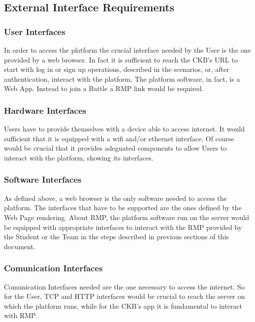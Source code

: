 \subsection{External Interface Requirements}

\subsubsection{User Interfaces}
In order to access the platform the crucial interface needed by the User is the one provided by a web browser. In fact it is sufficient to reach the CKB's URL to start with log in or sign up operations, described in the scenarios, or, after authentication, interact with the platform. The platform software, in fact, is a Web App. Instead to join a Battle a RMP link would be required.
\subsubsection{Hardware Interfaces}
Users have to provide themselves with a device able to access internet. It would sufficient that it is equipped with a wifi and/or ethernet interface. Of course would be crucial that it provides adeguated components to allow Users to interact with the platform, showing its interfaces.
\subsubsection{Software Interfaces}
As defined above, a web browser is the only software needed to access the platform. The interfaces that have to be supported are the ones defined by the Web Page rendering. About RMP, the platform software run on the server would be equipped with appropriate interfaces to interact with the RMP provided by the Student or the Team in the steps described in previous sections of this document.
\subsubsection{Comunication Interfaces}
Comunication Interfaces needed are the one necessary to access the internet. So for the User, TCP and HTTP interfaces would be crucial to reach the server on which the platform runs, while for the CKB's app it is fundamental to interact with RMP.


